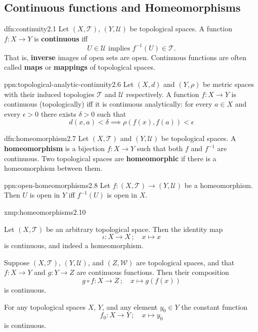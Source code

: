 \documentclass[landscape, 8pt]{extarticle}
\begin{document}
\begin{multicols}{3}
\section{Continuous functions and Homeomorphisms}

\begin{dfn}[Continuity]{dfn:continuity}{2.1}
    Let $(X, \mathcal{T})$, $(Y, \mathcal{U})$ be topological spaces. A function $f : X \to Y$ is \textbf{continuous} iff
    \[U \in \mathcal{U} \text{ implies } f^{-1}(U) \in \mathcal{T}.\]
    That is, \textbf{inverse} images of open sets are open. Continuous functions are often called \textbf{maps} or \textbf{mappings} of topological spaces.
\end{dfn}

\begin{ppn}{ppn:topological-analytic-continuity}{2.6}
    Let $(X, d)$ and $(Y, \rho)$ be metric spaces with their induced topologies $\mathcal{T}$ and $\mathcal{U}$ respectively. A function $f: X \to Y $ is continuous (topologically) iff it is continuous analytically: for every $a\in X$ and every $\epsilon > 0$ there exists $\delta > 0$ such that
    \[d(x, a) < \delta \implies \rho(f(x), f(a)) < \epsilon\]
\end{ppn}

\begin{dfn}[Homeomorphism]{dfn:homeomorphism}{2.7}
    Let $(X, \mathcal{T})$ and $(Y, \mathcal{U})$ be topological spaces. A \textbf{homeomorphism} is a bijection $f: X \to Y$ such that both $f$ and $f^{-1}$ are continuous. Two topological spaces are \textbf{homeomorphic} if there is a homeomorphism between them.
\end{dfn}

\begin{ppn}{ppn:open-homeomorphisms}{2.8}
    Let $f : (X, \mathcal{T}) \to (Y, \mathcal{U})$ be a homeomorphism. Then $U$ is open in $Y$ iff $f^{-1}(U)$ is open in $X$.
\end{ppn}


\begin{xmp}{xmp:homeomorphisms}{2.10}
    \begin{enumerate-tight}
        \item Let $(X, \mathcal{T})$ be an arbitrary topological space. Then the identity map
            \[\iota : X \to X \,;\quad x \mapsto x\]
            is continuous, and indeed a homeomorphism.
        \item Suppose $(X, \mathcal{T})$, $(Y, \mathcal{U})$, and $(Z, \mathcal{W})$ are topological spaces, and that $f : X \to Y$ and $g : Y \to Z$ are continuous functions. Then their composition
            \[g \circ f : X \to Z \,; \quad x \mapsto g(f(x))\]
            is continuous.
        \item For any topological spaces $X$, $Y$, and any element $y_{0} \in Y$ the constant function
            \[f_{0} : X \to Y \,; \quad x \mapsto y_{0}\]
            is continuous.
    \end{enumerate-tight}
\end{xmp}


\end{multicols}
\end{document}
